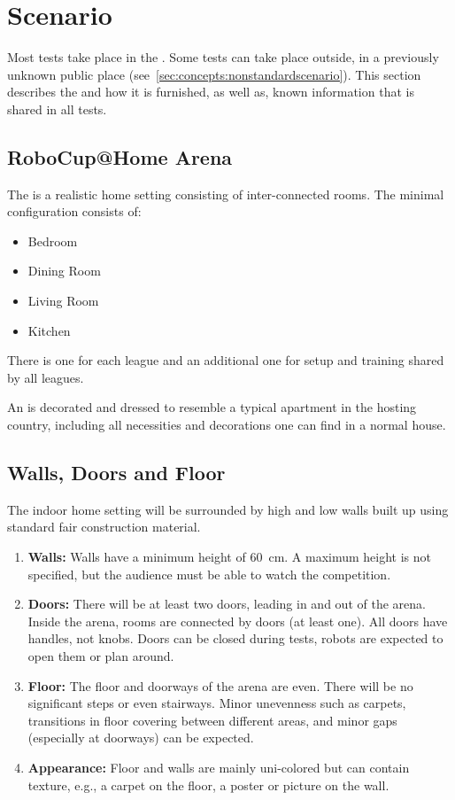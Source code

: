 \section{Scenario}
\label{sec:rules:scenario}
Most tests take place in the \RoboCup\AtHome{} \Arena{}. Some tests can take place outside, in a previously unknown public place (see~\ref{sec:concepts:nonstandardscenario}). This section describes the \Arena{} and how it is furnished,  as well as, known information that is shared in all tests. 

\subsection{RoboCup@Home Arena}
\label{sec:rules:scenario:arena}
The \RoboCup\AtHome{} \Arena{} is a realistic home setting consisting of inter-connected rooms.
The minimal configuration consists of:
\begin{itemize}
	\item Bedroom
	\item Dining Room
	\item Living Room
	\item Kitchen
\end{itemize}
There is one \Arena{} for each league and an additional one for setup and training shared by all leagues.

An \Arena{} is decorated and dressed to resemble a typical apartment in the hosting country, including all necessities and decorations one can find in a normal house.

\subsection{Walls, Doors and Floor}
\label{sec:rules:scenario:walls}
The indoor home setting will be surrounded by high and low walls built up using standard fair construction material.

\begin{enumerate}
	\item \textbf{Walls:} Walls have a minimum height of \SI{60}{\centi\meter}. A maximum height is not specified, but the audience must be able to watch the competition.

	\item \textbf{Doors:} There will be at least two doors, leading in and out of the arena.
	Inside the arena, rooms are connected by doors (at least one).
	All doors have handles, not knobs.
	Doors can be closed during tests, robots are expected to open them or plan around.

	\item \textbf{Floor:} The floor and doorways of the arena are even.
	There will be no significant steps or even stairways.
	Minor unevenness such as carpets, transitions in floor covering between different areas, and minor gaps (especially at doorways) can be expected.

	\item \textbf{Appearance:} Floor and walls are mainly uni-colored but can contain texture, e.g., a carpet on the floor, a poster or picture on the wall.\\
\end{enumerate}


